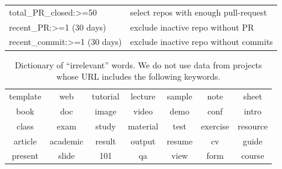 \documentclass[sigconf,review,anonymous]{acmart}
\begin{document}
\begin{table}[!b]
\begin{adjustbox}{max width=0.48\textwidth}
\begin{tabular}{l|l}
\rowcolor[HTML]{F3F3F3} 
{\color[HTML]{000000} total\_PR\_closed:\textgreater{}=50} & {\color[HTML]{000000} select repos with enough pull-request} \\
\rowcolor[HTML]{FFFFFF} 
{\color[HTML]{000000} recent\_PR:\textgreater{}=1 (30 days)} & {\color[HTML]{000000} exclude inactive repo without PR} \\
\rowcolor[HTML]{F3F3F3} 
{\color[HTML]{000000} recent\_commit:\textgreater{}=1 (30 days)} & {\color[HTML]{000000} exclude inactive repo without commits}
\end{tabular}
\end{adjustbox}
\end{table}

 
\begin{table}[!b]
\caption{Dictionary of ``irrelevant'' words. We do not use data from projects whose URL includes the following keywords.}
\label{tbl:dict}
\begin{adjustbox}{max width=0.48\textwidth}
\begin{tabular}{ccccccc}
\rowcolor[HTML]{BDBDBD} 
\multicolumn{7}{c}{\cellcolor[HTML]{BDBDBD}{\color[HTML]{000000} Suspicious Keywords}} \\ \hline
\rowcolor[HTML]{FFFFFF} 
{\color[HTML]{000000} template} & {\color[HTML]{000000} web} & {\color[HTML]{000000} tutorial} & {\color[HTML]{000000} lecture} & {\color[HTML]{000000} sample} & {\color[HTML]{000000} note} & {\color[HTML]{000000} sheet} \\
\rowcolor[HTML]{F3F3F3} 
{\color[HTML]{000000} book} & {\color[HTML]{000000} doc} & {\color[HTML]{000000} image} & {\color[HTML]{000000} video} & {\color[HTML]{000000} demo} & {\color[HTML]{000000} conf} & {\color[HTML]{000000} intro} \\
\rowcolor[HTML]{FFFFFF} 
{\color[HTML]{000000} class} & {\color[HTML]{000000} exam} & {\color[HTML]{000000} study} & {\color[HTML]{000000} material} & {\color[HTML]{000000} test} & {\color[HTML]{000000} exercise} & {\color[HTML]{000000} resource} \\
\rowcolor[HTML]{F3F3F3} 
{\color[HTML]{000000} article} & {\color[HTML]{000000} academic} & {\color[HTML]{000000} result} & {\color[HTML]{000000} output} & {\color[HTML]{000000} resume} & {\color[HTML]{000000} cv} & {\color[HTML]{000000} guide} \\
\rowcolor[HTML]{FFFFFF} 
{\color[HTML]{000000} present} & {\color[HTML]{000000} slide} & {\color[HTML]{000000} 101} & {\color[HTML]{000000} qa} & {\color[HTML]{000000} view} & {\color[HTML]{000000} form} & {\color[HTML]{000000} course} \\

\end{tabular}
\end{adjustbox}
\end{table}
\end{document}
